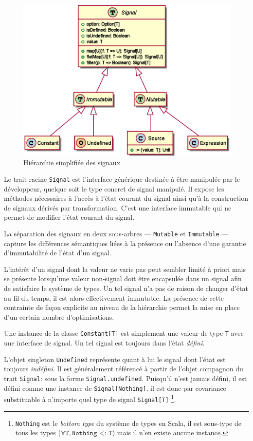 \begin{figure}[!h]
	\centering
	\includegraphics[width=12cm]{img/signals_simple}
	\caption{Hiérarchie simplifiée des signaux}
	\label{fig:sig-simple-hierarchy}	
\end{figure}

Le trait racine \texttt{Signal} est l'interface générique destinée à être manipulée par le développeur, quelque soit le type concret de signal manipulé. Il expose les méthodes nécessaires à l'accès à l'état courant du signal ainsi qu'à la construction de signaux dérivés par transformation. C'est une interface immutable qui ne permet de modifier l'état courant du signal.

La séparation des signaux en deux sous-arbres --- \texttt{Mutable} et \texttt{Immutable} --- capture les différences sémantiques liées à la présence ou l'absence d'une garantie d'immutabilité de l'état d'un signal.

L'intérêt d'un signal dont la valeur ne varie pas peut sembler limité à priori mais se présente lorsqu'une valeur non-signal doit être encapsulée dans un signal afin de satisfaire le système de types. Un tel signal n'a pas de raison de changer d'état au fil du temps, il est alors effectivement immutable. La présence de cette contrainte de façon explicite au niveau de la hiérarchie permet la mise en place d'un certain nombre d'optimisations.

Une instance de la classe \texttt{Constant[T]} est simplement une valeur de type \texttt{T} avec une interface de signal. Un tel signal est toujours dans l'état \emph{défini}.

L'objet singleton \texttt{Undefined} représente quant à lui le signal dont l'état est toujours \emph{indéfini}. Il est généralement référencé à partir de l'objet compagnon du trait \texttt{Signal}: sous la forme \texttt{Signal.undefined}. Puisqu'il n'est jamais défini, il est défini comme une instance de \texttt{Signal[Nothing]}, il est donc par covariance substituable à n'importe quel type de signal \texttt{Signal[T]} \footnote{\texttt{Nothing} est le \emph{bottom type} du système de types en Scala, il est sous-type de tous les types ($\forall \texttt{T}, \texttt{Nothing <: T}$) mais il n'en existe aucune instance.}.

